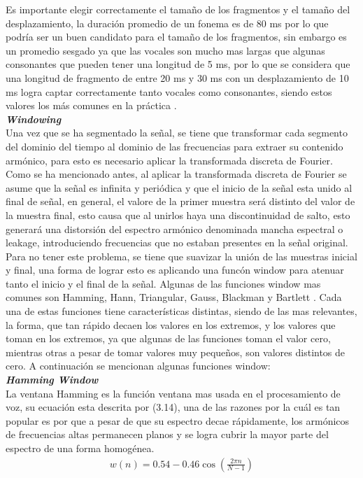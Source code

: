 Es importante elegir correctamente el tamaño de los fragmentos y el tamaño del desplazamiento, la duraci\'on promedio de un fonema es de 80 ms  por lo que podr\'ia ser un buen candidato para el tamaño de los fragmentos, sin embargo es un promedio sesgado ya que las vocales son mucho mas largas que algunas consonantes que pueden tener una longitud de 5 ms, por lo que se considera que una longitud de fragmento de entre 20 ms y 30 ms con un desplazamiento de 10 ms logra captar correctamente tanto vocales como consonantes, siendo estos valores los m\'as comunes en la pr\'actica \cite{beigi2011}.\\

\noindent
\textbf{\textit{Windowing}}\\
\indent
Una vez que se ha segmentado la señal, se tiene que transformar cada segmento del dominio del tiempo al dominio de las frecuencias para extraer su contenido arm\'onico, para esto es necesario aplicar la transformada discreta de Fourier. Como se ha mencionado antes, al aplicar la transformada discreta de Fourier se asume que la señal es infinita y peri\'odica y que el inicio de la señal esta unido al final de señal, en general, el valore de la primer muestra ser\'a distinto del valor de la muestra final, esto causa que al unirlos haya una discontinuidad de salto, esto generar\'a una distorsi\'on del espectro arm\'onico denominada mancha espectral o leakage, introduciendo frecuencias que no estaban presentes en la señal original.\\

Para no tener este problema, se tiene que suavizar la uni\'on de las muestras inicial y final, una forma de lograr esto es aplicando una func\'on window para atenuar tanto el inicio y el final de la señal. Algunas de las funciones window mas comunes son Hamming, Hann, Triangular, Gauss, Blackman y Bartlett \cite{beigi2011}. Cada una de estas funciones tiene caracter\'isticas distintas, siendo de las mas relevantes, la forma, que tan r\'apido decaen los valores en los extremos, y los valores que toman en los extremos, ya que algunas de las funciones toman el valor cero, mientras otras a pesar de tomar valores muy pequeños, son valores distintos de cero. A continuaci\'on se mencionan algunas funciones window:\\

\noindent
\textbf{\textit{Hamming Window}}\\
\indent
La ventana Hamming es la funci\'on ventana mas usada en el procesamiento de voz, su ecuaci\'on esta descrita por (3.14), una de las razones por la cu\'al es tan popular es por que a pesar de que su espectro decae r\'apidamente, los arm\'onicos de frecuencias altas permanecen planos y se logra cubrir la mayor parte del espectro de una forma homog\'enea.
\begin{align}
   w(n) = 0.54 - 0.46 \cos(\frac{2\pi n}{N - 1})
\end{align}

